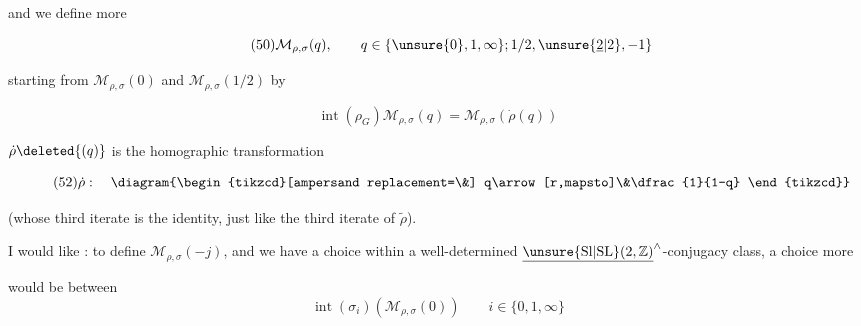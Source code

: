 and we define more 

\begin{equation*}
\tag{50}
\mathcal M_{\rho,\sigma}(q),\qquad
q\in\{\unsure{0},1,\infty\};1/2,\unsure{\underline 2|2},-1\}
\end{equation*}

starting from $\mathcal M_{\rho,\sigma}(0)$ and
$\mathcal M_{\rho,\sigma}(1/2)$ by

\begin{equation*}
\tag{51}
\operatorname{int}(\rho_G)\mathcal M_{\rho,\sigma}(q)
=\mathcal M_{\rho,\sigma}(\dot\rho(q))
\end{equation*}


$\dot\rho\deleted{(q)}$ is the homographic transformation

\begin{equation*}
\tag{52}
\dot\rho:\quad
\diagram{\begin{tikzcd}[ampersand replacement=\&]
q\arrow[r,mapsto]\&\dfrac{1}{1-q}
\end{tikzcd}}
\end{equation*}

(whose third iterate is the identity, just like the third iterate
of $\widetilde\rho$).

I would like : to define $\mathcal M_{\rho,\sigma}(-j)$, and
 we have a choice within a well-determined
$\underline{\unsure{\mathrm{Sl}|\mathrm{SL}}(2,\mathbb Z)}^{\wedge}$-conjugacy class,
a choice more


 would be between
\[
\operatorname{int}(\sigma_i)(\mathcal M_{\rho,\sigma}(0))
\qquad i\in\{0,1,\infty\}
\tag{53}
\]
